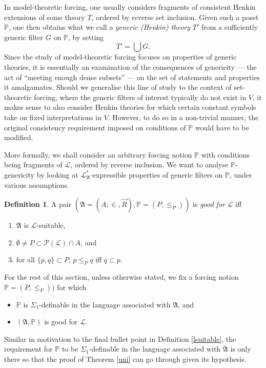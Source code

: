 \documentclass[12pt, twoside]{memoir}
\numberwithin{equation}{section}
\theoremstyle{definition}
\newtheorem{defi}[thm]{Definition}
\theoremstyle{remark}
\theoremstyle{definition}
\theoremstyle{definition}
\theoremstyle{definition}
\theoremstyle{remark}
\begin{document}
In model-theoretic forcing, one usually considers fragments of consistent Henkin extensions of some theory $T$, ordered by reverse set inclusion. Given such a poset $\mathbb{P}$, one then obtains what we call a \textit{generic (Henkin) theory} $T'$ from a sufficiently generic filter $G$ on $\mathbb{P}$, by setting $$T' = \bigcup G \text{.}$$ Since the study of model-theoretic forcing focuses on properties of generic theories, it is essentially an examination of the consequences of genericity --- the act of ``meeting enough dense subsets'' --- on the set of statements and properties it amalgamates. Should we generalise this line of study to the context of set-theoretic forcing, where the generic filters of interest typically do not exist in $V$, it makes sense to also consider Henkin theories for which certain constant symbols take on fixed interpretations in $V$. However, to do so in a non-trivial manner, the original consistency requirement imposed on conditions of $\mathbb{P}$ would have to be modified.

More formally, we shall consider an arbitrary forcing notion $\mathbb{P}$ with conditions being fragments of $\mathcal{L}$, ordered by reverse inclusion. We want to analyse $\mathbb{P}$-genericity by looking at $\mathcal{L}^{*}_{\mathfrak{A}}$-expressible properties of generic filters on $\mathbb{P}$, under various assumptions.

\begin{defi}
A pair $(\mathfrak{A} = (A; \in, \Vec{R}), \mathbb{P} = (P, \leq_P))$ is \emph{good for} $\mathcal{L}$ iff 
\begin{enumerate}[label=(\alph*)]
    \item $\mathfrak{A}$ is $\mathcal{L}$-suitable,
    \item $\emptyset \neq P \subset \mathcal{P}(\mathcal{L}) \cap A$, and
    \item for all $\{p, q\} \subset P$, $p \leq_P q$ iff $q \subset p$.
\end{enumerate}
\end{defi}

For the rest of this section, unless otherwise stated, we fix a forcing notion $\mathbb{P} = (P, \leq_P))$ for which
\begin{itemize}
    \item $\mathbb{P}$ is $\Sigma_1$-definable in the language associated with $\mathfrak{A}$, and
    \item $(\mathfrak{A}, \mathbb{P})$ is good for $\mathcal{L}$.
\end{itemize}
Similar in motivation to the final bullet point in Definition \ref{lsuitable}, the requirement for $\mathbb{P}$ to be $\Sigma_1$-definable in the language associated with $\mathfrak{A}$ is only there so that the proof of Theorem \ref{uni} can go through given its hypothesis.
\end{document}
